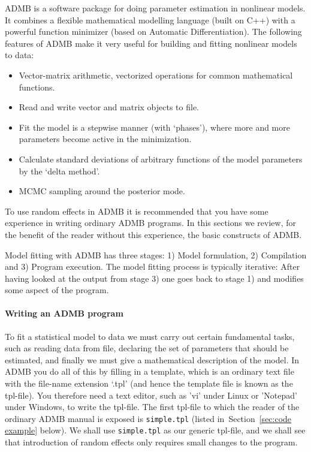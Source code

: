 \documentclass[12pt,letter,reqno]{book}
\begin{document}
ADMB is a software package for doing parameter estimation in nonlinear
models. It combines a flexible mathematical modelling language (built on
C++) with a powerful function minimizer (based on Automatic
Differentiation). The following features of ADMB make it very useful for
building and fitting nonlinear models to data:

\begin{itemize}
\item Vector-matrix arithmetic, vectorized operations for common mathematical functions.
\item Read and write vector and matrix objects to file.
\item Fit the model is a stepwise manner (with `phases'), where more and more parameters become active in the minimization.
\item Calculate standard deviations of arbitrary functions of the model parameters by the `delta method'.
\item MCMC sampling around the posterior mode.
\end{itemize}
To use random effects in ADMB it is recommended that you have some experience in writing ordinary ADMB programs.
In this sections we review, for the benefit of the reader without this experience, the basic constructs of ADMB.

Model fitting with ADMB has three stages: 1) Model formulation, 2) Compilation and 3) Program execution.
The model fitting process is typically iterative: After having looked at the output from stage 3) one goes back to
stage 1) and modifies some aspect of the program.

\paragraph{Writing an ADMB program}
To fit a statistical model to data we must carry out certain fundamental tasks, such as
reading data from file, declaring the set of parameters that should be estimated, and finally we must give a
mathematical description of the model. In ADMB you do all of this by filling in a template, which is an ordinary
text file with the file-name extension `.tpl' (and hence the template file is known as the tpl-file). You
therefore need a text editor, such as 'vi' under Linux or 'Notepad' under Windows, to write the tpl-file. The
first tpl-file to which the reader of the ordinary ADMB manual is exposed is \texttt{simple.tpl} (listed
in~Section~\ref{sec:code example} below). We shall use \texttt{simple.tpl} as our generic tpl-file, and we shall
see that introduction of random effects only requires small changes to the program.
\end{document}
